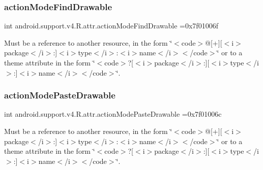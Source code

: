 \subsubsection{\texorpdfstring{action\+Mode\+Find\+Drawable}{actionModeFindDrawable}}
{\footnotesize\ttfamily int android.\+support.\+v4.\+R.\+attr.\+action\+Mode\+Find\+Drawable =0x7f01006f\hspace{0.3cm}{\ttfamily [static]}}

Must be a reference to another resource, in the form \char`\"{}$<$code$>$@\mbox{[}+\mbox{]}\mbox{[}$<$i$>$package$<$/i$>$\+:\mbox{]}$<$i$>$type$<$/i$>$\+:$<$i$>$name$<$/i$>$$<$/code$>$\char`\"{} or to a theme attribute in the form \char`\"{}$<$code$>$?\mbox{[}$<$i$>$package$<$/i$>$\+:\mbox{]}\mbox{[}$<$i$>$type$<$/i$>$\+:\mbox{]}$<$i$>$name$<$/i$>$$<$/code$>$\char`\"{}. \mbox{\label{classandroid_1_1support_1_1v4_1_1R_1_1attr_a6b7c3e96ea6bb4c2290019bafb9a4aa2}} 
\subsubsection{\texorpdfstring{action\+Mode\+Paste\+Drawable}{actionModePasteDrawable}}
{\footnotesize\ttfamily int android.\+support.\+v4.\+R.\+attr.\+action\+Mode\+Paste\+Drawable =0x7f01006c\hspace{0.3cm}{\ttfamily [static]}}

Must be a reference to another resource, in the form \char`\"{}$<$code$>$@\mbox{[}+\mbox{]}\mbox{[}$<$i$>$package$<$/i$>$\+:\mbox{]}$<$i$>$type$<$/i$>$\+:$<$i$>$name$<$/i$>$$<$/code$>$\char`\"{} or to a theme attribute in the form \char`\"{}$<$code$>$?\mbox{[}$<$i$>$package$<$/i$>$\+:\mbox{]}\mbox{[}$<$i$>$type$<$/i$>$\+:\mbox{]}$<$i$>$name$<$/i$>$$<$/code$>$\char`\"{}. \mbox{\label{classandroid_1_1support_1_1v4_1_1R_1_1attr_a2d18ec285a2e3e5cd9722429901f2d83}} 
